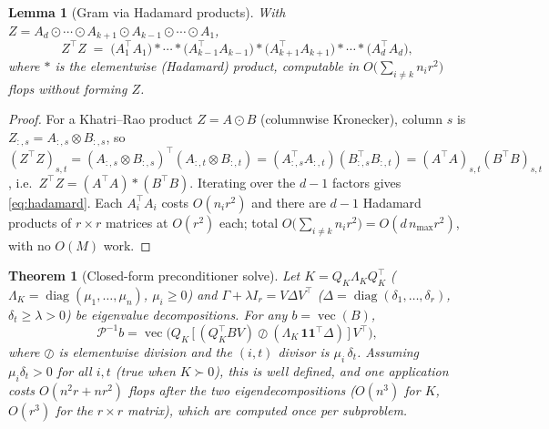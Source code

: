 \documentclass[12pt]{article}
\DeclareMathOperator{\vecop}{vec}
\DeclareMathOperator{\diag}{diag}
\newtheorem{theorem}{Theorem}
\newtheorem{lemma}{Lemma}
\begin{document}
\begin{lemma}[Gram via Hadamard products]\label{lem:gram}
With $Z=A_d\odot\cdots\odot A_{k+1}\odot A_{k-1}\odot\cdots\odot A_1$,
\begin{equation}\label{eq:hadamard}
  Z^{\!\top}Z\;=\;\big(A_1^{\!\top}A_1\big)\ast\cdots\ast
  \big(A_{k-1}^{\!\top}A_{k-1}\big)\ast
  \big(A_{k+1}^{\!\top}A_{k+1}\big)\ast\cdots\ast\big(A_d^{\!\top}A_d\big),
\end{equation}
where $\ast$ is the elementwise (Hadamard) product, computable in
$O\!\big(\sum_{i\ne k}n_i r^2\big)$ flops without forming $Z$.
\end{lemma}

\begin{proof}
For a Khatri--Rao product $Z=A\odot B$ (columnwise Kronecker), column $s$ is
$Z_{:,s}=A_{:,s}\otimes B_{:,s}$, so
$(Z^{\!\top}Z)_{s,t}=(A_{:,s}\otimes B_{:,s})^{\!\top}(A_{:,t}\otimes B_{:,t})
=(A_{:,s}^{\!\top}A_{:,t})(B_{:,s}^{\!\top}B_{:,t})
=(A^{\!\top}A)_{s,t}(B^{\!\top}B)_{s,t}$, i.e.\
$Z^{\!\top}Z=(A^{\!\top}A)\ast(B^{\!\top}B)$. Iterating over the $d-1$ factors
gives \eqref{eq:hadamard}. Each $A_i^{\!\top}A_i$ costs $O(n_i r^2)$ and there
are $d-1$ Hadamard products of $r\times r$ matrices at $O(r^2)$ each; total
$O\!\big(\sum_{i\ne k}n_i r^2\big)=O(d\,n_{\max}r^2)$, with no $O(M)$ work.
\end{proof}

\begin{theorem}[Closed-form preconditioner solve]\label{thm:precsolve}
Let $K=Q_K\Lambda_K Q_K^{\!\top}$ ($\Lambda_K=\diag(\mu_1,\dots,\mu_n)$,
$\mu_i\ge0$) and $\Gamma+\lambda I_r=V\Delta V^{\!\top}$
($\Delta=\diag(\delta_1,\dots,\delta_r)$, $\delta_t\ge\lambda>0$) be eigenvalue
decompositions. For any $b=\vecop(B)$,
\begin{equation}\label{eq:Pinv}
  \mathcal{P}^{-1}b
  =\vecop\!\Big(Q_K\,\big[\,(Q_K^{\!\top}BV)\oslash(\Lambda_K\,\mathbf{1}\mathbf{1}^{\!\top}\Delta)\,\big]\,V^{\!\top}\Big),
\end{equation}
where $\oslash$ is elementwise division and the $(i,t)$ divisor is
$\mu_i\,\delta_t$. Assuming $\mu_i\delta_t>0$ for all $i,t$ (true when $K\succ0$),
this is well defined, and one application costs $O(n^2r+nr^2)$ flops after the two
eigendecompositions ($O(n^3)$ for $K$, $O(r^3)$ for the $r\times r$ matrix), which
are computed once per subproblem.
\end{theorem}
\end{document}
